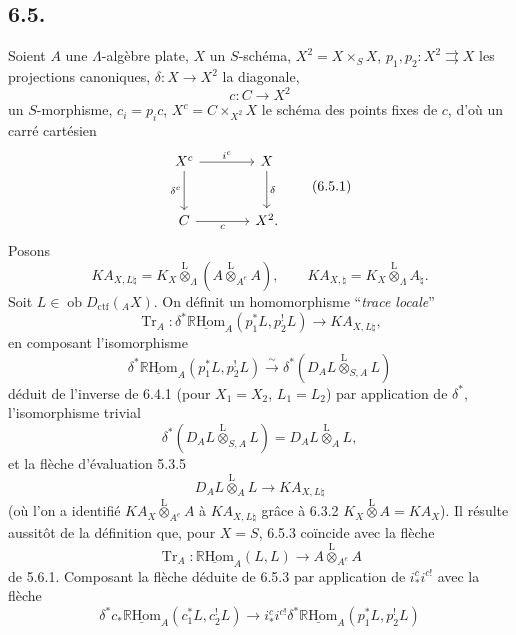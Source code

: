 \documentclass[11pt]{article}
\newcommand{\R}{\mathbb{R}}\newcommand{\RHomCore}{\mathbb{R}\mathrm{Hom}}
\providecommand{\RHom}{\RHomCore}
\providecommand{\uRHom}{\underline{\RHom}}
\providecommand{\Tr}{\operatorname{Tr}}
\providecommand{\Tr}{\operatorname{Tr}}
\providecommand{\lten}{\overset{\mathrm L}{\otimes}}
\providecommand{\Ob}{\operatorname{ob}}
\providecommand{\Tr}{\operatorname{Tr}}
\providecommand{\RHom}{\RHomCore}
\providecommand{\lten}{\overset{\mathrm L}{\otimes}}
\providecommand{\RHom}{\R\mathcal{H}om}
\providecommand{\lten}{\overset{\mathrm L}{\otimes}}
\providecommand{\Ob}{\operatorname{ob}}
\providecommand{\R}{\mathrm R}
\providecommand{\Tr}{\operatorname{Tr}}
\providecommand{\lten}{\overset{\mathrm L}{\otimes}}
\providecommand{\lten}{\overset{\mathrm L}{\otimes}}
\providecommand{\Ob}{\operatorname{Ob}}
\providecommand{\lten}{\overset{\mathrm L}{\otimes}}
\providecommand{\RHom}{\RHomCore}
\providecommand{\Tr}{\operatorname{Tr}}
\providecommand{\Ob}{\operatorname{ob}}
\providecommand{\Ob}{\operatorname{Ob}}
\providecommand{\lten}{\overset{\mathrm L}{\otimes}}
\begin{document}
\subsection*{6.5.}
Soient $A$ une $\Lambda$-algèbre plate, $X$ un $S$-schéma, $X^2=X\times_SX$, $p_1,p_2:X^2\rightrightarrows X$ les projections canoniques, $\delta:X\to X^2$ la diagonale,
\[
c:C\longrightarrow X^2
\]
un $S$-morphisme, $c_i=p_ic$, $X^c=C\times_{X^2}X$ le schéma des points fixes de $c$, d'où un carré cartésien
\begin{equation}
\begin{tikzcd}[column sep=large,row sep=large]
X^c \arrow[r,"i^c"] \arrow[d,"\delta^c"'] & X \arrow[d,"\delta"]\\
C \arrow[r,"c"'] & X^2 .
\end{tikzcd}
\tag{6.5.1}
\end{equation}
Posons
\begin{equation}
KA_{X,L\natural}=K_X\lten_{\Lambda}(A\lten_{A^e}A),
\qquad
KA_{X,\natural}=K_X\lten_{\Lambda}A_{\natural}.
\tag{6.5.2}
\end{equation}
Soit $L\in\Ob D_{\mathrm{ctf}}({}_AX)$. On définit un homomorphisme ``\emph{trace locale}''
\begin{equation}
\Tr_A:\delta^*\uRHom_A(p_1^*L,p_2^!L)
\longrightarrow
KA_{X,L\natural},
\tag{6.5.3}
\end{equation}
en composant l'isomorphisme
\begin{equation}
\delta^*\uRHom_A(p_1^*L,p_2^!L)
\xrightarrow{\sim}
\delta^*(D_AL\lten_{S,A}L)
\tag{6.5.4}
\end{equation}
déduit de l'inverse de 6.4.1 (pour $X_1=X_2$, $L_1=L_2$) par application de $\delta^*$, l'isomorphisme trivial
\begin{equation}
\delta^*(D_AL\lten_{S,A}L)=D_AL\lten_AL,
\tag{6.5.5}
\end{equation}
et la flèche d'évaluation 5.3.5
\begin{equation}
D_AL\lten_AL\longrightarrow KA_{X,L\natural}
\tag{6.5.6}
\end{equation}
(où l'on a identifié $KA_X\lten_{A^e}A$ à $KA_{X,L\natural}$ grâce à 6.3.2 $K_X\lten A=KA_X$). Il résulte aussitôt de la définition que, pour $X=S$, 6.5.3 coïncide avec la flèche
\[
\Tr_A:\uRHom_A(L,L)\longrightarrow A\lten_{A^e}A
\]
de 5.6.1. Composant la flèche déduite de 6.5.3 par application de $i_*^ci^{c!}$ avec la flèche
\begin{equation}
\delta^*c_*\uRHom_A(c_1^*L,c_2^!L)
\longrightarrow
i_*^ci^{c!}\delta^*\uRHom_A(p_1^*L,p_2^!L)
\tag{6.5.7}
\end{equation}
\end{document}
